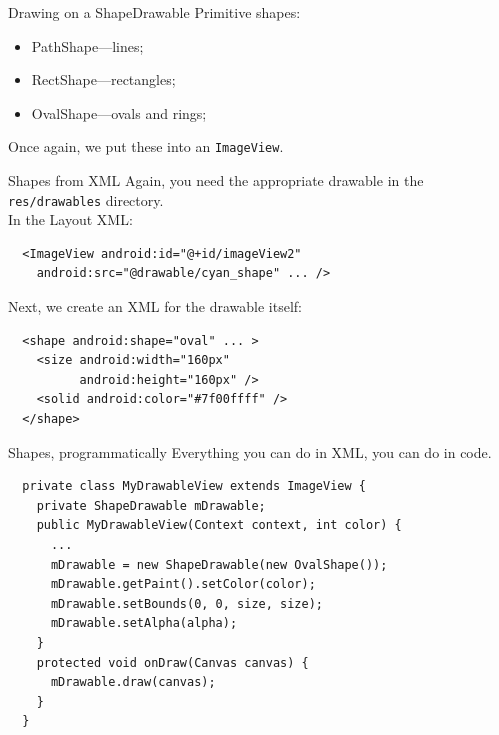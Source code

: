 \documentclass[aspectratio=169]{beamer}
\begin{document}
\begin{frame}[fragile]{Drawing on a ShapeDrawable}
\Large
Primitive shapes: 
\begin{itemize}
\item PathShape---lines;
\item RectShape---rectangles;
\item OvalShape---ovals and rings;
\end{itemize}
\vspace{2em}
Once again, we put these into an {\tt ImageView}.
\end{frame}



\begin{frame}[fragile]{Shapes from XML}
Again, you need the appropriate drawable in the {\tt res/drawables} directory.\\[1em]

In the Layout XML:
\begin{verbatim}
  <ImageView android:id="@+id/imageView2"
    android:src="@drawable/cyan_shape" ... />
\end{verbatim}

Next, we create an XML for the drawable itself:
\begin{verbatim}
  <shape android:shape="oval" ... >
    <size android:width="160px" 
          android:height="160px" />
    <solid android:color="#7f00ffff" />
  </shape>
\end{verbatim}
\end{frame}



\begin{frame}[fragile]{Shapes, programmatically}
Everything you can do in XML, you can do in code.

{\small
\begin{verbatim}
  private class MyDrawableView extends ImageView {
    private ShapeDrawable mDrawable;
    public MyDrawableView(Context context, int color) {
      ...
      mDrawable = new ShapeDrawable(new OvalShape());
      mDrawable.getPaint().setColor(color);
      mDrawable.setBounds(0, 0, size, size);
      mDrawable.setAlpha(alpha);
    }
    protected void onDraw(Canvas canvas) {
      mDrawable.draw(canvas);
    }
  }
\end{verbatim}
}
\end{frame}
\end{document}
